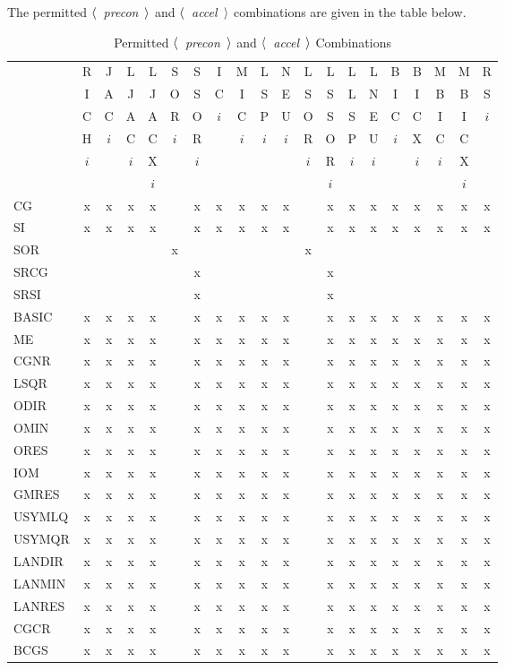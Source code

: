 \begin{table}

    The permitted $\langle$~{\em precon}~$\rangle$ and $\langle$~{\em accel}~$\rangle$ 
combinations are given in the table below.
\bigskip
\begin{center}
\begin{tabular}{|l|c|c|c|c|c|c|c|c|c|c|c|c|c|c|c|c|c|c|c|}
 \hline 
  &R&J&L&L&S&S&I&M&L&N&L&L&L&L&B&B&M&M&R \\
  &I&A&J&J&O&S&C&I&S&E&S&S&L&N&I&I&B&B&S \\
  &C&C&A&A&R&O&$i$&C&P&U&O&S&S&E&C&C&I&I&$i$ \\
  &H&$i$&C&C&$i$&R& &$i$&$i$&$i$&R&O&P&U&$i$&X&C&C& \\
  &$i$& &$i$&X& &$i$& & & & &$i$&R&$i$&$i$& &$i$&$i$&X& \\
  & & & &$i$& & & & & & & &$i$& & & & & &$i$& \\ \hline
 CG     &x&x&x&x& &x&x&x&x&x& &x&x&x&x&x&x&x&x \\
 SI     &x&x&x&x& &x&x&x&x&x& &x&x&x&x&x&x&x&x \\ 
 SOR    & & & & &x& & & & & &x& & & & & & & &  \\ 
 SRCG   & & & & & &x& & & & & &x& & & & & & &  \\ 
 SRSI   & & & & & &x& & & & & &x& & & & & & &  \\ 
 BASIC  &x&x&x&x& &x&x&x&x&x& &x&x&x&x&x&x&x&x \\ 
 ME     &x&x&x&x& &x&x&x&x&x& &x&x&x&x&x&x&x&x \\ 
 CGNR   &x&x&x&x& &x&x&x&x&x& &x&x&x&x&x&x&x&x \\ 
 LSQR   &x&x&x&x& &x&x&x&x&x& &x&x&x&x&x&x&x&x \\ 
 ODIR   &x&x&x&x& &x&x&x&x&x& &x&x&x&x&x&x&x&x \\ 
 OMIN   &x&x&x&x& &x&x&x&x&x& &x&x&x&x&x&x&x&x \\ 
 ORES   &x&x&x&x& &x&x&x&x&x& &x&x&x&x&x&x&x&x \\ 
 IOM    &x&x&x&x& &x&x&x&x&x& &x&x&x&x&x&x&x&x \\ 
 GMRES  &x&x&x&x& &x&x&x&x&x& &x&x&x&x&x&x&x&x \\ 
 USYMLQ &x&x&x&x& &x&x&x&x&x& &x&x&x&x&x&x&x&x \\ 
 USYMQR &x&x&x&x& &x&x&x&x&x& &x&x&x&x&x&x&x&x \\ 
 LANDIR &x&x&x&x& &x&x&x&x&x& &x&x&x&x&x&x&x&x \\ 
 LANMIN &x&x&x&x& &x&x&x&x&x& &x&x&x&x&x&x&x&x \\ 
 LANRES &x&x&x&x& &x&x&x&x&x& &x&x&x&x&x&x&x&x \\ 
 CGCR   &x&x&x&x& &x&x&x&x&x& &x&x&x&x&x&x&x&x \\ 
 BCGS   &x&x&x&x& &x&x&x&x&x& &x&x&x&x&x&x&x&x \\ \hline
\end{tabular}
\caption{Permitted $\langle$~{\em precon}~$\rangle$ and 
         $\langle$~{\em accel}~$\rangle$ Combinations}
\end{center}
\end{table}

